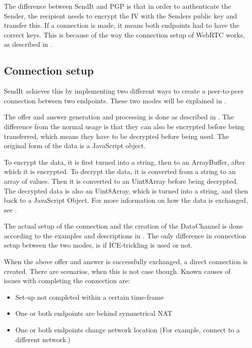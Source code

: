 	The difference between SendIt and PGP is that in order to authenticate the Sender, the recipient needs to encrypt the IV with the Senders public key and transfer this. If a connection is made, it means both endpoints had to have the correct keys. This is because of the way the connection setup of WebRTC works, as described in .
	
	\subsection{Connection setup}
	\label{sec:conn_set_imp}
			SendIt achieves this by implementing two different ways to create a peer-to-peer connection between two endpoints. These two modes will be explained in .

			The offer and answer generation and processing is done as described in . The difference from the normal usage is that they can also be encrypted before being transferred, which means they have to be decrypted before being used. The original form of the data is a JavaScript object.

			To encrypt the data, it is first turned into a string, then to an ArrayBuffer, after which it is encrypted. To decrypt the data, it is converted from a string to an array of values. Then it is converted to an Uint8Array before being decrypted. The decrypted data is also an Uint8Array, which is turned into a string, and then back to a JavaScript Object. For more information on how the data is exchanged, see .

			The actual setup of the connection and the creation of the DataChannel is done according to the examples and descriptions in . The only difference in connection setup between the two modes, is if ICE-trickling is used or not.

			When the above offer and answer is successfully exchanged, a direct connection is created. There are scenarios, when this is not case though. Known causes of issues with completing the connection are:
			\begin{itemize}
			\item Set-up not completed within a certain time-frame
			\item One or both endpoints are behind symmetrical NAT
			\item One or both endpoints change network location (For example, connect to a different network.)
			\end{itemize}

